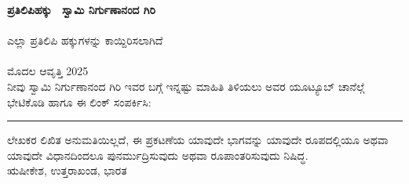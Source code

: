 \thispagestyle{empty}
\textbf{\large ಪ್ರತಿಲಿಪಿಹಕ್ಕು \textcopyright\ ಸ್ವಾಮಿ ನಿರ್ಗುಣಾನಂದ ಗಿರಿ}\\
\\
ಎಲ್ಲಾ ಪ್ರತಿಲಿಪಿ ಹಕ್ಕುಗಳನ್ನು ಕಾಯ್ದಿರಿಸಲಾಗಿದೆ\\
\\
ಮೊದಲ ಆವೃತ್ತಿ 2025\\

\vspace*{2cm}
{{\footnotesize ನೀವು ಸ್ವಾಮಿ ನಿರ್ಗುಣಾನಂದ ಗಿರಿ ಇವರ ಬಗ್ಗೆ ಇನ್ನಷ್ಟು ಮಾಹಿತಿ ತಿಳಿಯಲು  ಅವರ ಯೂಟ್ಯೂಬ್ ಚಾನೆಲ್ಗೆ ಭೇಟಿಕೊಡಿ ಹಾಗೂ ಈ ಲಿಂಕ್ ಸಂಪರ್ಕಿಸಿ:} \textbf{}}


\vfill
\rule{\textwidth}{2pt}
{\footnotesize {\cpRightInfoColor ಲೇಖಕರ ಲಿಖಿತ ಅನುಮತಿಯಿಲ್ಲದೆ, ಈ ಪ್ರಕಟಣೆಯ ಯಾವುದೇ ಭಾಗವನ್ನು ಯಾವುದೇ ರೂಪದಲ್ಲಿಯೂ ಅಥವಾ ಯಾವುದೇ ವಿಧಾನದಿಂದಲೂ ಪುನರ್ಮುದ್ರಿಸುವುದು ಅಥವಾ ರೂಪಾಂತರಿಸುವುದು ನಿಷಿದ್ಧ.}\\

ಋಷೀಕೇಶ, ಉತ್ತರಾಖಂಡ, ಭಾರತ 
\\}
\newpage